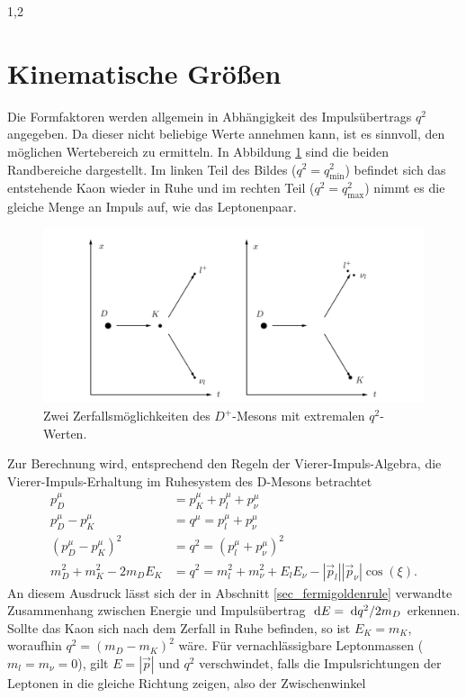 \documentclass[11pt,a4paper,twoside]{report}
\begin{document}
\begin{spacing}{1,2}
\section{Kinematische Größen}
Die Formfaktoren werden allgemein in Abhängigkeit des Impulsübertrags $q^2$ angegeben. Da dieser nicht beliebige Werte annehmen kann, ist es sinnvoll, den 
möglichen Wertebereich zu ermitteln.  In Abbildung \ref{pic_DZerfall} sind die beiden Randbereiche dargestellt. Im linken Teil des Bildes ($q^2=q^2_\text{min}$)
befindet sich das entstehende Kaon wieder in Ruhe und im rechten Teil ($q^2=q^2_\text{max}$) nimmt es die gleiche Menge an Impuls auf, wie das Leptonenpaar.
\begin{figure}[h]
\includegraphics[width=1\textwidth]{Abbildungen/DZerfall.png}
\caption{Zwei Zerfallsmöglichkeiten des $D^+$-Mesons  mit extremalen $q^2$-Werten.}
\label{pic_DZerfall}
\end{figure}
\noindent
Zur Berechnung wird, entsprechend den Regeln der Vierer-Impuls-Algebra, die Vierer-Impuls-Erhaltung im Ruhesystem des D-Mesons betrachtet
\begin{align}
 p_D^\mu &= p_K^\mu + p_l^\mu + p_\nu^\mu \nonumber\\
 p_D^\mu - p_K^\mu &= q^\mu = p_l^\mu + p_\nu^\mu \nonumber\\
 \left(p_D^\mu-p_K^\mu\right)^2 &= q^2 =  (p_l^\mu + p_\nu^\mu )^2\nonumber\\
 m_D^2 + m_K^2 - 2m_DE_K &= q^2 = m_l^2 + m_\nu^2 + E_lE_\nu - |\vec p_l||\vec p_\nu|\cos(\xi).
\end{align}
An diesem Ausdruck lässt sich der in Abschnitt \ref{sec_fermigoldenrule} verwandte Zusammenhang zwischen Energie und Impulsübertrag 
$\; \mathrm{d} E = \; \mathrm{d} q^2/2m_D$ erkennen.
Sollte das Kaon sich nach dem Zerfall in Ruhe befinden, so ist $E_K = m_K$, woraufhin $q^2 = (m_D-m_K)^2$ wäre. Für vernachlässigbare Leptonmassen 
($m_l=m_\nu=0$), gilt $E=|\vec p|$ und $q^2$ verschwindet, falls die Impulsrichtungen der Leptonen in die gleiche Richtung zeigen, also der Zwischenwinkel

\end{spacing}
\end{document}

